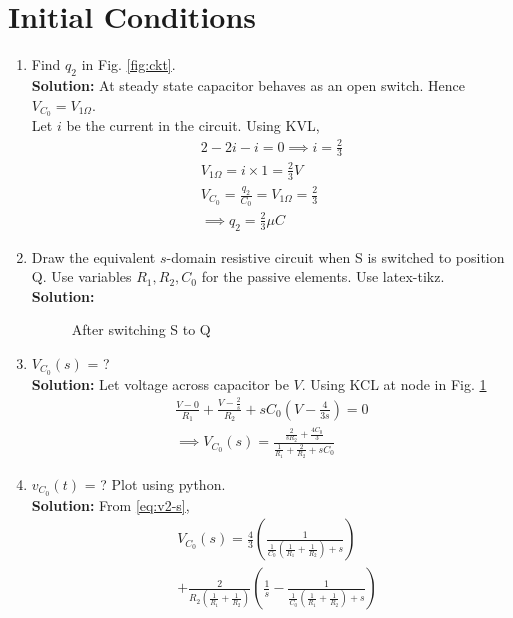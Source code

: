 \documentclass[journal,12pt,twocolumn]{IEEEtran}
\newcommand{\solution}{\noindent \textbf{Solution: }}
\providecommand{\brak}[1]{\ensuremath{\left(#1\right)}}
\numberwithin{equation}{section}
\renewcommand\thesection{\arabic{section}}
\begin{document}
 \section{Initial Conditions}
\begin{enumerate}[label=\arabic*.,ref=\thesection.\theenumi]
\item Find $q_2$ in Fig. \ref{fig:ckt}.\\
			\solution At steady state capacitor behaves as an open switch. Hence $V_{C_0}=V_{1 \Omega}$.\\
			Let $i$ be the current in the circuit. Using KVL,
			\begin{align}
				2-2i-i=0 \implies i=\frac{2}{3}\\
				V_{1 \Omega}=i \times 1= \frac{2}{3} V\\
			V_{C_0}=\frac{q_2}{C_0}=V_{1 \Omega}=\frac{2}{3}\\
			\implies q_2=\frac{2}{3} \mu C
			\end{align}
\item Draw the equivalent $s$-domain resistive circuit when S is switched to position Q.  Use variables $R_1, R_2, C_0$ for the passive elements.
Use latex-tikz.
		\label{prob:init}
		\\\solution 
	\begin{figure}[!ht]
 \centering

\caption{After switching S to Q}
\label{fig:sq}
\end{figure}
		\item $V_{C_0}(s)$ = ? \\
		\solution Let voltage across capacitor be $V$. Using KCL at node in Fig. \ref{fig:sq}
\begin{align}
    \frac{V - 0}{R_1} + \frac{V - \frac{2}{s}}{R_2} + sC_0\brak{V - \frac{4}{3s}} = 0 \\
\implies V_{C_0}(s) = \frac{\frac{2}{sR_2} + \frac{4C_0}{3}}{\frac{1}{R_1} + \frac{2}{R_2} + sC_0}
\label{eq:v2-s}
\end{align} 
	\item $v_{C_0}(t)$ = ? Plot using python.\\
	\solution From \eqref{eq:v2-s},
\begin{align}
    &V_{C_0}(s) = \frac{4}{3}\brak{\frac{1}{\frac{1}{C_0}\brak{\frac{1}{R_1} + \frac{1}{R_2}}+s}} \nonumber \\
    &+ \frac{2}{R_2\brak{\frac{1}{R_1} +\frac{1}{R_2}}}\brak{\frac{1}{s} - \frac{1}{\frac{1}{C_0}\brak{\frac{1}{R_1} + \frac{1}{R_2}} + s}}
\end{align}

\end{enumerate}
\end{document}
